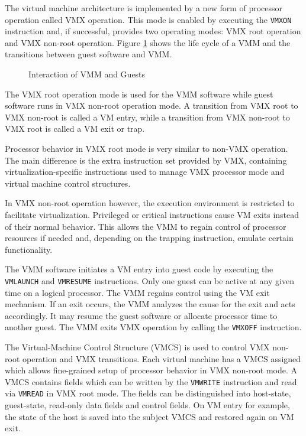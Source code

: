 The virtual machine architecture is implemented by a new form of processor
operation called VMX operation. This mode is enabled by executing the
\texttt{VMXON} instruction and, if successful, provides two operating modes:
VMX root operation and VMX non-root operation. Figure \ref{fig:vmm-lifecycle}
shows the life cycle of a VMM and the transitions between guest software and
VMM.

\begin{figure}[h]
	\centering
	
	\caption{Interaction of VMM and Guests}
	\label{fig:vmm-lifecycle}
\end{figure}

The VMX root operation mode is used for the VMM software while guest software
runs in VMX non-root operation mode. A transition from VMX root to VMX non-root
is called a VM entry, while a transition from VMX non-root to VMX root is
called a VM exit or trap.

Processor behavior in VMX root mode is very similar to non-VMX operation.  The
main difference is the extra instruction set provided by VMX, containing
virtualization-specific instructions used to manage VMX processor mode and
virtual machine control structures.

In VMX non-root operation however, the execution environment is restricted to
facilitate virtualization. Privileged or critical instructions cause VM exits
instead of their normal behavior. This allows the VMM to regain control of
processor resources if needed and, depending on the trapping instruction,
emulate certain functionality.

The VMM software initiates a VM entry into guest code by executing the
\texttt{VMLAUNCH} and \texttt{VMRESUME} instructions. Only one guest can be
active at any given time on a logical processor. The VMM regains control
using the VM exit mechanism. If an exit occurs, the VMM analyzes the cause for
the exit and acts accordingly. It may resume the guest software or allocate
processor time to another guest. The VMM exits VMX operation by calling the
\texttt{VMXOFF} instruction.

The Virtual-Machine Control Structure (VMCS) is used to control VMX
non-root operation and VMX transitions. Each virtual machine has a VMCS
assigned which allows fine-grained setup of processor behavior in VMX non-root
mode. A VMCS contains fields which can be written by the
\texttt{VMWRITE} instruction and read via
\texttt{VMREAD} in VMX root mode. The fields can be distinguished
into host-state, guest-state, read-only data fields and control fields. On VM
entry for example, the state of the host is saved into the subject VMCS and
restored again on VM exit.

